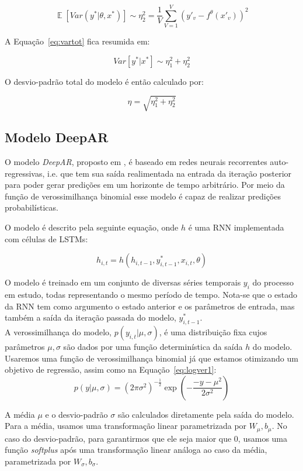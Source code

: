 \[
  \mathop{\mathbb{E}}[Var(y^* | \theta,x^*)] \sim \eta_2^2 = \frac{1}{V}\sum^V_{V=1}(y'_v - f^\theta(x'_v))^2
\]



A Equação~\ref{eq:vartot} fica resumida em:


\[ Var[y^* | x^*] \sim \eta^2_1 + \eta^2_2 \] 

O desvio-padrão total do modelo é então calculado por:

\[
  \eta = \sqrt{\eta^2_1 + \eta^2_2}  
\]


\subsection{Modelo DeepAR}

O modelo \textit{DeepAR}, proposto em \citep{deepar}, é baseado em redes neurais recorrentes auto-regressivas,
i.e. que tem sua saída realimentada na entrada da iteração posterior para
poder gerar predições em um horizonte de tempo arbitrário. Por meio da função de verossimilhança binomial esse modelo é capaz
de realizar predições probabilísticas.

O modelo é descrito pela seguinte equação, onde $h$ é uma RNN implementada com células de LSTMs:

\[
h_{i,t} = h(h_{i,t-1},y^*_{i,t-1},x_{i,t}, \theta)
\]

O modelo é treinado em um conjunto de diversas séries temporais $y_i$ do
processo em estudo, todas representando o mesmo período de tempo. Nota-se que o estado da RNN tem como argumento o estado anterior e os parâmetros de entrada, mas também a saída da iteração passada do modelo, $y^*_{i,t-1}$. \\

A verossimilhança do modelo, $p(y_{i,t} | \mu,\sigma)$, é uma distribuição fixa
cujos parâmetros $\mu, \sigma$ são dados por uma função determinística da saída $h$ do modelo. Usaremos uma função de verossimilhança binomial já que estamos otimizando um objetivo de regressão, assim como na Equação~\ref{eq:logver1}:
\[
  p(y | \mu,\sigma) = {(2\pi\sigma^2)}^{-\frac{1}{2}} \exp(-  \frac{-y - \mu^2}{2\sigma^2})  
\]

A média $\mu$ e o desvio-padrão $\sigma$ são calculados diretamente pela saída do modelo. Para a média, usamos uma transformação linear parametrizada por $W_{\mu},b_{\mu}$. No caso do desvio-padrão, para garantirmos que ele seja maior que 0, usamos uma função \textit{softplus} após uma transformação linear análoga ao caso da média, parametrizada por  $W_{\sigma},b_{\sigma}$.\\

